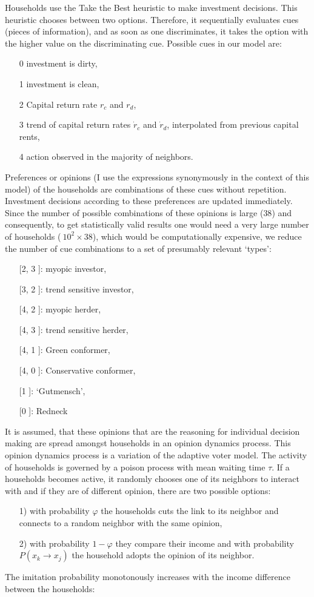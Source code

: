 Households use the Take the Best heuristic to make investment decisions. This heuristic chooses between two options. Therefore, it sequentially evaluates cues (pieces of information), and as soon as one discriminates, it takes the option with the higher value on the discriminating cue. Possible cues in our model are:
\begin{itemize}
	\item[0] investment is dirty,
	\item[1] investment is clean,
	\item[2] Capital return rate $r_c$ and $r_d$,	
	\item[3] trend of capital return rates $\dot{r}_c$ and $\dot{r}_d$, interpolated from previous capital rents,
	\item[4] action observed in the majority of neighbors.
\end{itemize}
Preferences or opinions (I use the expressions synonymously in the context of this model) of the households are combinations of these cues without repetition. Investment decisions according to these preferences are updated immediately. \\
Since the number of possible combinations of these opinions is large ($38$) and consequently, to get statistically valid results one would need a very large number of households ($ ~ 10^2 \times 38$), which would be computationally expensive, we reduce the number of cue combinations to a set of presumably relevant `types':
\begin{itemize}
	\item [[2, 3]]: myopic investor,
	\item [[3, 2]]: trend sensitive investor,
	\item [[4, 2]]: myopic herder,
	\item [[4, 3]]: trend sensitive herder,
	\item [[4, 1]]: Green conformer,
	\item [[4, 0]]: Conservative conformer,
	\item [[1]]: `Gutmensch',
	\item [[0]]: Redneck
\end{itemize}
It is assumed, that these opinions that are the reasoning for individual decision making are spread amongst households in an opinion dynamics process. This opinion dynamics process is a variation of the adaptive voter model. The activity of households is governed by a poison process with mean waiting time $\tau$. If a households becomes active, it randomly chooses one of its neighbors to interact with and if they are of different opinion, there are two possible options:
\begin{itemize}
	\item [1)] with probability $\varphi$ the households cuts the link to its neighbor and connects to a random neighbor with the same opinion,
	\item [2)] with probability $1-\varphi$ they compare their income and with probability $P(x_k \rightarrow x_j)$ the household adopts the opinion of its neighbor.
\end{itemize}
The imitation probability monotonously increases with the income difference between the households: 

